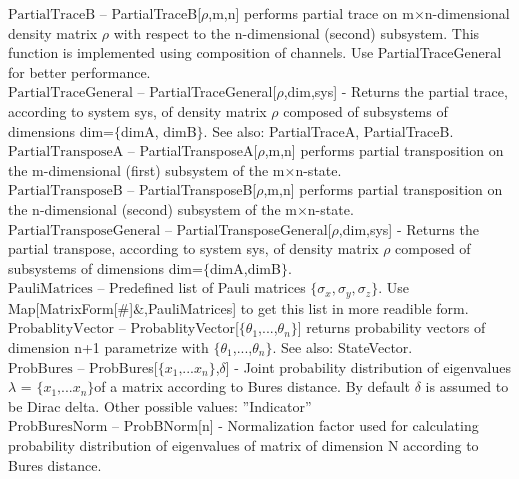 \documentclass[a4paper,10pt]{scrartcl}
\begin{document}
\textbf{$ \text{PartialTraceB} $ }-- PartialTraceB[$\rho $,m,n] performs partial trace on m$\times $n-dimensional density matrix $\rho $ with respect to the n-dimensional (second) subsystem. This function is implemented using composition of channels. Use PartialTraceGeneral for better performance.$  $\\

\textbf{$ \text{PartialTraceGeneral} $ }-- PartialTraceGeneral[$\rho $,dim,sys] - Returns the partial trace, according to system sys, of density matrix $\rho $ composed of subsystems of dimensions dim=$\{$dimA, dimB$\}$. See also: PartialTraceA, PartialTraceB.$  $\\

\textbf{$ \text{PartialTransposeA} $ }-- PartialTransposeA[$\rho $,m,n] performs partial transposition on the m-dimensional (first) subsystem of the m$\times $n-state.$  $\\

\textbf{$ \text{PartialTransposeB} $ }-- PartialTransposeB[$\rho $,m,n] performs partial transposition on the n-dimensional (second) subsystem of the m$\times $n-state.$  $\\

\textbf{$ \text{PartialTransposeGeneral} $ }-- PartialTransposeGeneral[$\rho $,dim,sys] - Returns the partial transpose, according to system sys, of density matrix $\rho $ composed of subsystems of dimensions dim=$\{$dimA,dimB$\}$. $  $\\

\textbf{$ \text{PauliMatrices} $ }-- Predefined list of Pauli matrices $\{$$ \sigma _x,\sigma _y,\sigma _z $$\}$. Use Map[MatrixForm[$\#$]$\&$,PauliMatrices] to get this list in more readible form.$  $\\

\textbf{$ \text{ProbablityVector} $ }-- ProbablityVector[$\{$$ \theta _1 $,...,$ \theta _n $$\}$] returns probability vectors of dimension n+1 parametrize with $\{$$ \theta _1 $,...,$ \theta _n $$\}$. See also: StateVector.$  $\\

\textbf{$ \text{ProbBures} $ }-- ProbBures[$\{$$ x_1\text{,...}x_n $$\}$,$\delta $] - Joint probability distribution of eigenvalues $\lambda $ = $\{$$ x_1\text{,...}x_n $$\}$of a matrix according to Bures distance. By default $\delta $ is assumed to be Dirac delta. Other possible values: ''Indicator''$  $\\

\textbf{$ \text{ProbBuresNorm} $ }-- ProbBNorm[n] - Normalization factor used for calculating probability distribution of eigenvalues of matrix of dimension N according to Bures distance.$  $\\
\end{document}
